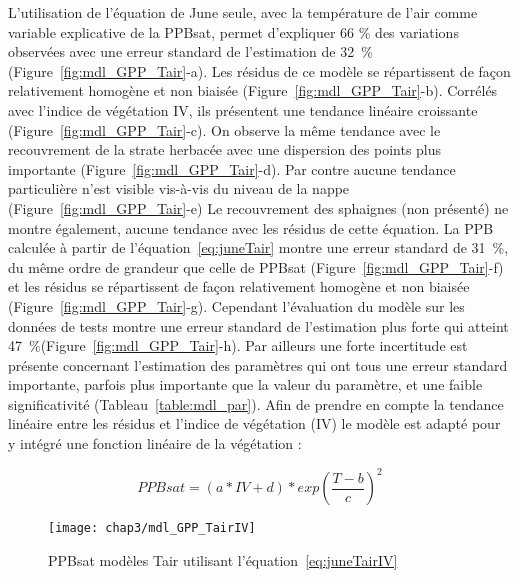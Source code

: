 L'utilisation de l'équation de June seule, avec la température de l'air comme variable explicative de la PPBsat, permet d'expliquer 66 \% des variations observées avec une erreur standard de l'estimation de \SI{32}{\percent} (Figure~\ref{fig:mdl_GPP_Tair}-a).
Les résidus de ce modèle se répartissent de façon relativement homogène et non biaisée (Figure~\ref{fig:mdl_GPP_Tair}-b).
Corrélés avec l'indice de végétation IV, ils présentent une tendance linéaire croissante (Figure~\ref{fig:mdl_GPP_Tair}-c).
On observe la même tendance avec le recouvrement de la strate herbacée avec une dispersion des points plus importante (Figure~\ref{fig:mdl_GPP_Tair}-d).
Par contre aucune tendance particulière n'est visible vis-à-vis du niveau de la nappe (Figure~\ref{fig:mdl_GPP_Tair}-e)
Le recouvrement des sphaignes (non présenté) ne montre également, aucune tendance avec les résidus de cette équation.
La PPB calculée à partir de l'équation~\ref{eq:juneTair} montre une erreur standard de \SI{31}{\percent}, du même ordre de grandeur que celle de PPBsat (Figure~\ref{fig:mdl_GPP_Tair}-f) et les résidus se répartissent de façon relativement homogène et non biaisée (Figure~\ref{fig:mdl_GPP_Tair}-g).
Cependant l'évaluation du modèle sur les données de tests montre une erreur standard de l'estimation plus forte qui atteint \SI{47}{\percent}(Figure~\ref{fig:mdl_GPP_Tair}-h).
Par ailleurs une forte incertitude est présente concernant l'estimation des paramètres qui ont tous une erreur standard importante, parfois plus importante que la valeur du paramètre, et une faible significativité (Tableau~\ref{table:mdl_par}).
Afin de prendre en compte la tendance linéaire entre les résidus et l'indice de végétation (IV) le modèle est adapté pour y intégré une fonction linéaire de la végétation :

\begin{equation}\label{eq:juneTairIV}
PPBsat = (a * IV + d) * exp(\frac{T - b}{c})^2
\end{equation}

\begin{figure}
\centering
\texttt{[image: chap3/mdl\_GPP\_TairIV]}
\caption{PPBsat modèles Tair utilisant l'équation~\ref{eq:juneTairIV}}
\label{fig:mdl_GPP_TairIV}
\end{figure}

